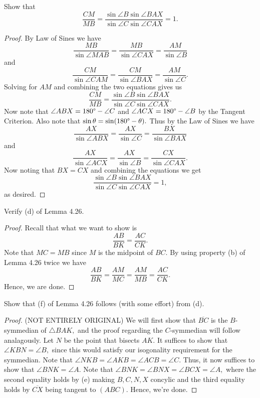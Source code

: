 \documentclass[letterpaper,oneside]{scrartcl}
\providecommand{\ol}{\overline}
\begin{document}
\begin{problem*}
  [4.25]
  Show that
  $$\frac{CM}{MB} = \frac{\sin\angle B \sin\angle BAX}{\sin\angle C \sin\angle CAX} =1.$$
\end{problem*}
\begin{proof}
  By Law of Sines we have
  $$\frac{MB}{\sin\angle MAB} = \frac{MB}{\sin\angle CAX} = \frac{AM}{\sin\angle B}$$
  and $$\frac{CM}{\sin\angle CAM} = \frac{CM}{\sin\angle BAX} = \frac{AM}{\sin\angle C}.$$
  Solving for $AM$ and combining the two equations gives us
  $$\frac{CM}{MB} = \frac{\sin\angle B \sin\angle BAX}{\sin\angle C \sin\angle CAX}.$$
  Now note that $\angle ABX = 180\degree - \angle C$ and $\angle ACX = 180\degree - \angle B$ by the Tangent Criterion. Also note that $\sin\theta = \sin(180\degree - \theta).$ Thus by the Law of Sines we have
  $$\frac{AX}{\sin\angle ABX} = \frac{AX}{\sin\angle C} = \frac{BX}{\sin\angle BAX}$$
  and $$\frac{AX}{\sin\angle ACX} = \frac{AX}{\sin\angle B} = \frac{CX}{\sin\angle CAX}.$$
  Now noting that $BX = CX$ and combining the equations we get
  $$\frac{\sin\angle B \sin\angle BAX}{\sin\angle C \sin\angle CAX} = 1,$$ as desired.
\end{proof}
\begin{problem*}
  [4.28]
  Verify (d) of Lemma 4.26.
\end{problem*}
\begin{proof}
  Recall that what we want to show is
  $$\frac{AB}{BK}=\frac{AC}{CK}.$$
  Note that $MC=MB$ since $M$ is the midpoint of $BC.$ 
  By using property (b) of Lemma 4.26 twice we have
  $$\frac{AB}{BK}=\frac{AM}{MC} = \frac{AM}{MB}=\frac{AC}{CK}.$$ Hence, we are done.
\end{proof}
\begin{problem*}
  [4.29]
  Show that (f) of Lemma 4.26 follows (with some effort) from (d).
\end{problem*}
\begin{proof}
  (NOT ENTIRELY ORIGINAL) We will first show that $\ol{BC}$ is the $B$-symmedian of $\triangle BAK,$ and the proof regarding the $C$-symmedian will follow analagously. Let $N$ be the point that bisects $AK.$ It suffices to show that $\angle KBN = \angle B,$ since this would satisfy our isogonality requirement for the symmedian. Note that $\angle NKB = \angle AKB = \angle ACB = \angle C.$ Thus, it now suffices to show that $\angle BNK = \angle A.$ Note that $\angle BNK = \angle BNX = \angle BCX = \angle A,$ where the second equality holds by (e) making $B,C,N,X$ concylic and the third equality holds by $\ol{CX}$ being tangent to $(ABC).$ Hence, we're done.
\end{proof}
\end{document}
